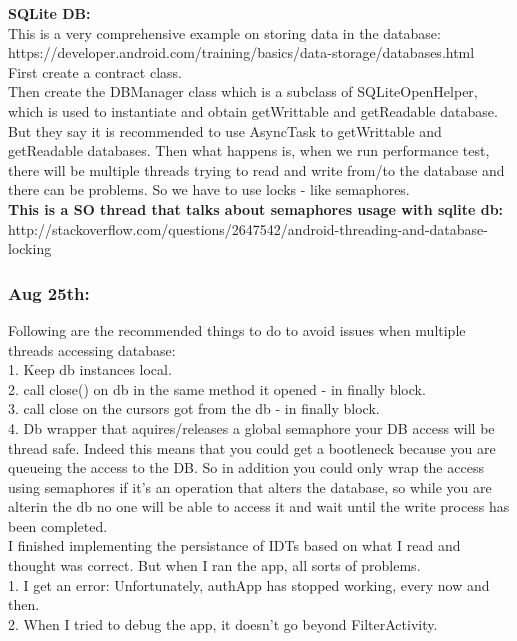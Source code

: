 \documentclass[11pt]{article}
\begin{document}
\textbf{SQLite DB:}\\
This is a very comprehensive example on storing data in the database: https://developer.android.com/training/basics/data-storage/databases.html\\
First create a contract class.\\
Then create the DBManager class which is a subclass of SQLiteOpenHelper, which is used to instantiate and obtain getWrittable and getReadable 
database.\\
But they say it is recommended to use AsyncTask to getWrittable and getReadable databases. Then what happens is, when we run performance test, there 
will be multiple threads trying to read and write from/to the database and there can be problems. So we have to use locks - like semaphores.\\
\textbf{This is a SO thread that talks about semaphores usage with sqlite db:} 
http://stackoverflow.com/questions/2647542/android-threading-and-database-locking\\

\subsubsection*{Aug 25th:}
Following are the recommended things to do to avoid issues when multiple threads accessing database:\\
1. Keep db instances local.\\
2. call close() on db in the same method it opened - in finally block.\\
3. call close on the cursors got from the db - in finally block.\\
4. Db wrapper that aquires/releases a global semaphore your DB access will be thread safe. Indeed this means that you could get a bootleneck because 
you are queueing the access to the DB. So in addition you could only wrap the access using semaphores if it's an operation that alters the database, 
so while you are alterin the db no one will be able to access it and wait until the write process has been completed.\\

I finished implementing the persistance of IDTs based on what I read and thought was correct. But when I ran the app, all sorts of problems.\\
1. I get an error: Unfortunately, authApp has stopped working, every now and then.\\
2. When I tried to debug the app, it doesn't go beyond FilterActivity.\\
\end{document}
